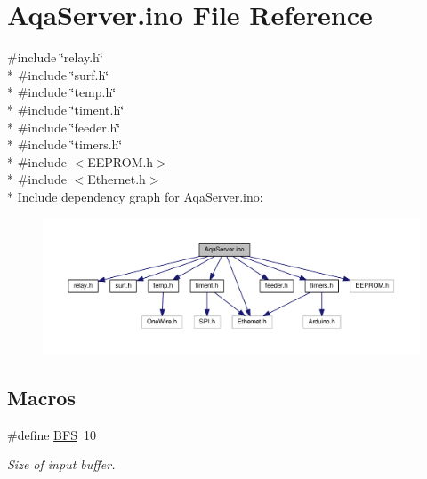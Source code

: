 \hypertarget{_aqa_server_8ino}{\section{Aqa\+Server.\+ino File Reference}
\label{_aqa_server_8ino}
}
{\ttfamily \#include \char`\"{}relay.\+h\char`\"{}}\\*
{\ttfamily \#include \char`\"{}surf.\+h\char`\"{}}\\*
{\ttfamily \#include \char`\"{}temp.\+h\char`\"{}}\\*
{\ttfamily \#include \char`\"{}timent.\+h\char`\"{}}\\*
{\ttfamily \#include \char`\"{}feeder.\+h\char`\"{}}\\*
{\ttfamily \#include \char`\"{}timers.\+h\char`\"{}}\\*
{\ttfamily \#include $<$E\+E\+P\+R\+O\+M.\+h$>$}\\*
{\ttfamily \#include $<$Ethernet.\+h$>$}\\*
Include dependency graph for Aqa\+Server.\+ino\+:\nopagebreak
\begin{figure}[H]
\begin{center}
\leavevmode
\includegraphics[width=350pt]{_aqa_server_8ino__incl}
\end{center}
\end{figure}
\subsection*{Macros}
\begin{DoxyCompactItemize}
\item 
\#define \hyperlink{_aqa_server_8ino_a1b83ef6dcb797171631472c31018beef}{B\+F\+S}~10
\begin{DoxyCompactList}\small\item\em Size of input buffer. \end{DoxyCompactList}\end{DoxyCompactItemize}
